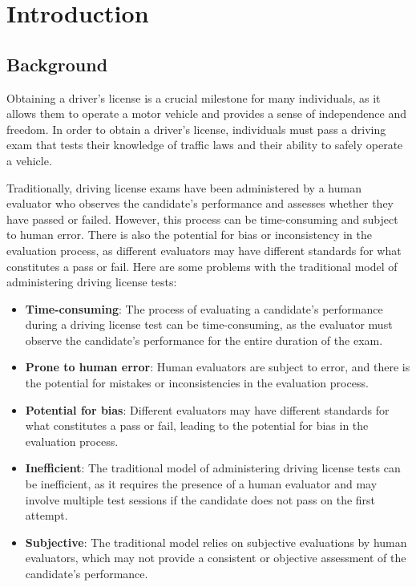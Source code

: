 

\newpage
{} %

\chapter{Introduction}
\section{Background}\label{sec:bkgrnd}%
 Obtaining a driver's license is a crucial milestone for many individuals, as it allows them to operate a motor vehicle and provides a sense of independence and freedom. In order to obtain a driver's license, individuals must pass a driving exam that tests their knowledge of traffic laws and their ability to safely operate a vehicle.

Traditionally, driving license exams have been administered by a human evaluator who observes the candidate's performance and assesses whether they have passed or failed. However, this process can be time-consuming and subject to human error. There is also the potential for bias or inconsistency in the evaluation process, as different evaluators may have different standards for what constitutes a pass or fail.
Here are some problems with the traditional model of administering driving license tests:
\begin{itemize}
\item \textbf{Time-consuming}: The process of evaluating a candidate's performance during a driving license test can be time-consuming, as the evaluator must observe the candidate's performance for the entire duration of the exam.
\item \textbf{Prone to human error}: Human evaluators are subject to error, and there is the potential for mistakes or inconsistencies in the evaluation process.
\item \textbf{Potential for bias}: Different evaluators may have different standards for what constitutes a pass or fail, leading to the potential for bias in the evaluation process.
\item \textbf{Inefficient}: The traditional model of administering driving license tests can be inefficient, as it requires the presence of a human evaluator and may involve multiple test sessions if the candidate does not pass on the first attempt.
\item \textbf{Subjective}: The traditional model relies on subjective evaluations by human evaluators, which may not provide a consistent or objective assessment of the candidate's performance.
\end{itemize}

